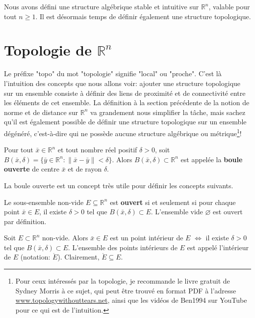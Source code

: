 \documentclass{report}
\newcommand*{\norm}[1]{\lVert#1\rVert}
\newcommand*{\interior}[1]{\mathring{#1}}
\begin{document}
Nous avons défini une structure algébrique stable et intuitive sur $\mathbb R^n$, valable pour tout $n \geq 1$. Il est désormais temps de définir également une structure topologique.

\section{Topologie de $\mathbb R^n$}
Le préfixe "topo" du mot "topologie" signifie "local" ou "proche". C'est là l'intuition des concepts que nous allons voir: ajouter une structure topologique sur un ensemble consiste à définir des liens de proximité et de connectivité entre les éléments de cet ensemble. La définition à la section précédente de la notion de norme et de distance sur $\mathbb R^n$ va grandement nous simplifier la tâche, mais sachez qu'il est également possible de définir une structure topologique sur un ensemble dégénéré, c'est-à-dire qui ne possède aucune structure algébrique ou métrique\footnote{Pour ceux intéressés par la topologie, je recommande le livre gratuit de Sydney Morris à ce sujet, qui peut être trouvé en format PDF à l'adresse \url{www.topologywithouttears.net}, ainsi que les vidéos de Ben1994 sur YouTube pour ce qui est de l'intuition.}! \par

\begin{defn}
	Pour tout $\bar x \in \mathbb R^n$ et tout nombre réel positif $\delta > 0$, soit $B(\bar x, \delta) = \{\bar y \in \mathbb R^n : \norm{\bar x - \bar y} < \delta\}$. Alors $B(\bar x, \delta) \subset \mathbb R^n$ est appelée la \textbf{boule ouverte} de centre $\bar x$ et de rayon $\delta$.
\end{defn}
\begin{remark}La boule ouverte est un concept très utile pour définir les concepts suivants.\end{remark}

\begin{defn}
	Le sous-ensemble non-vide $E \subseteq \mathbb R^n$ est \textbf{ouvert} si et seulement si pour chaque point $\bar x \in E$, il existe $\delta > 0$ tel que $B(\bar x, \delta) \subset E$. L'ensemble vide $\varnothing$ est ouvert par définition.
\end{defn}

\begin{defn}
	Soit $E \subset \mathbb R^n$ non-vide. Alors $\bar x \in E$ est un point intérieur de $E$ $\iff$ il existe $\delta > 0$ tel que $B(\bar x, \delta) \subset E$. L'ensemble des points intérieurs de $E$ est appelé l'intérieur de $E$ (notation: $\interior E$). Clairement, $\interior E \subseteq E$. \\
\end{defn}
\end{document}
